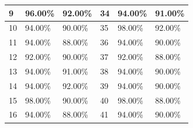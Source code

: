 \begin{table}[H]
\begin{tabular}{|l|l|l|l|l|l|}
			9  & 96.00\%                                                               & 92.00\%                                                                 & 34 & 94.00\%                                                                & 91.00\%                                                                 \\ \hline
			10 & 94.00\%                                                               & 90.00\%                                                                 & 35 & 98.00\%                                                                & 92.00\%                                                                 \\ \hline
			11 & 94.00\%                                                               & 88.00\%                                                                 & 36 & 94.00\%                                                                & 90.00\%                                                                 \\ \hline
			12 & 92.00\%                                                               & 90.00\%                                                                 & 37 & 92.00\%                                                                & 88.00\%                                                                 \\ \hline
			13 & 94.00\%                                                               & 91.00\%                                                                 & 38 & 94.00\%                                                                & 90.00\%                                                                 \\ \hline
			14 & 94.00\%                                                               & 92.00\%                                                                 & 39 & 94.00\%                                                                & 90.00\%                                                                 \\ \hline
			15 & 98.00\%                                                               & 90.00\%                                                                 & 40 & 98.00\%                                                                & 88.00\%                                                                 \\ \hline
			16 & 94.00\%                                                               & 88.00\%                                                                 & 41 & 94.00\%                                                                & 90.00\%                                                                 \\ \hline

\end{tabular}
\end{table}
